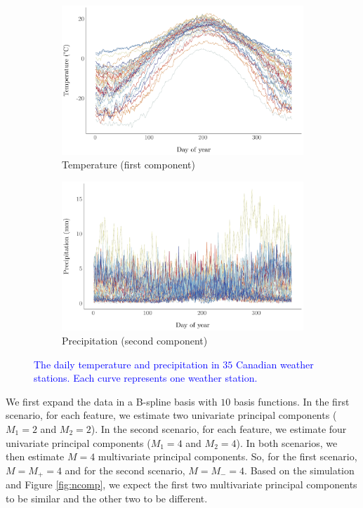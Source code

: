 \begin{figure}
     \centering
     \begin{subfigure}[b]{0.49\textwidth}
         \centering
         \includegraphics[width=1\textwidth]{figures/temperature.pdf}
         \caption{Temperature (first component)}
         \label{fig:temperature}
     \end{subfigure}
     \hfill
     \begin{subfigure}[b]{0.49\textwidth}
         \centering
         \includegraphics[width=1\textwidth]{figures/precipitation.pdf}
         \caption{Precipitation (second component)}
         \label{fig:precipitation}
     \end{subfigure}
     \caption{\textcolor{blue}{The daily temperature and precipitation in $35$ Canadian weather stations. Each curve represents one weather station.}}
     \label{fig:weather}
\end{figure}

We first expand the data in a B-spline basis with $10$ basis functions. In the first scenario, for each feature, we estimate two univariate principal components ($M_1 = 2$ and $M_2 = 2$). In the second scenario, for each feature, we estimate four univariate principal components ($M_1 = 4$ and $M_2 = 4$). In both scenarios, we then estimate $M = 4$ multivariate principal components. So, for the first scenario, $M = M_{+} = 4$ and for the second scenario, $M = M_{-} = 4$. Based on the simulation and Figure \ref{fig:ncomp}, we expect the first two multivariate principal components to be similar and the other two to be different.

